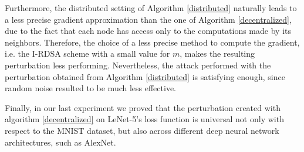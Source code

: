 Furthermore, the
distributed setting of Algorithm \ref{distributed} naturally leads to a less precise gradient approximation than the one of Algorithm \ref{decentralized}, due to the
fact that each node has access only to the computations made by its neighbors. Therefore, the choice of a less precise
method to compute the gradient, i.e. the I-RDSA scheme with a small value for $m$, makes the resulting perturbation
less performing. Nevertheless, the attack performed with the perturbation obtained from Algorithm \ref{distributed} is satisfying enough, since random noise resulted to be much less effective.

Finally, in our last experiment we proved that the perturbation created with algorithm \ref{decentralized} on LeNet-5's loss function is universal
not only with respect to the MNIST dataset, but also across different deep neural network architectures, such as AlexNet.

